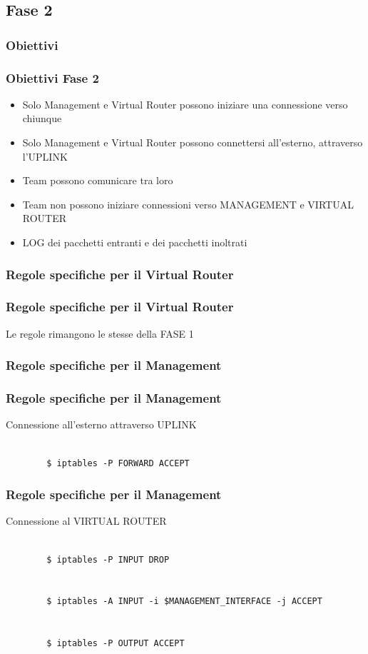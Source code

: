 \documentclass{beamer}
\begin{document}
\subsection{Fase 2}
\subsubsection{Obiettivi}
\begin{frame}
    \frametitle{Obiettivi Fase 2}
    \begin{itemize}
        \item<1-> Solo Management e Virtual Router possono iniziare una connessione verso chiunque
        \item<2-> Solo Management e Virtual Router possono connettersi all'esterno, attraverso l'UPLINK
        \item<3-> Team possono comunicare tra loro
        \item<4-> Team non possono iniziare connessioni verso MANAGEMENT e VIRTUAL ROUTER
        \item<4-> LOG dei pacchetti entranti e dei pacchetti inoltrati
    \end{itemize}
    

\end{frame}
\subsubsection{Regole specifiche per il Virtual Router}
\begin{frame}[fragile]
    \frametitle{Regole specifiche per il Virtual Router}
    Le regole rimangono le stesse della FASE 1
\end{frame}


\subsubsection{Regole specifiche per il Management}
\begin{frame}[fragile]
    \frametitle{Regole specifiche per il Management}
    Connessione all'esterno attraverso UPLINK
    \\~\\
    \begin{lstlisting}
        $ iptables -P FORWARD ACCEPT
    \end{lstlisting}
\end{frame}

\begin{frame}[fragile]
    \frametitle{Regole specifiche per il Management}
    Connessione al VIRTUAL ROUTER
    \\~\\
    \begin{lstlisting}
        $ iptables -P INPUT DROP
        
        
        $ iptables -A INPUT -i $MANAGEMENT_INTERFACE -j ACCEPT
        
        
        $ iptables -P OUTPUT ACCEPT

    \end{lstlisting}
\end{frame}
\end{document}
